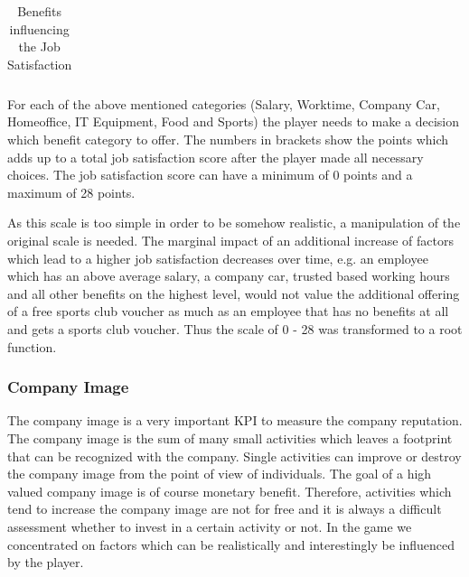 \begin{table}[]
\begin{tabular}{l|c|c}
\end{tabular}
\caption{Benefits influencing the Job Satisfaction}
    \label{tab:benefitsJSS}
\end{table}

For each of the above mentioned categories (Salary, Worktime, Company Car, Homeoffice, IT Equipment, Food and Sports) the player needs to make a decision which benefit category to offer. The numbers in brackets show the points which adds up to a total job satisfaction score after the player made all necessary choices. The job satisfaction score can have a minimum of 0 points and a maximum of 28 points.

As this scale is too simple in order to be somehow realistic, a manipulation of the original scale is needed. The marginal impact of an additional increase of factors which lead to a higher job satisfaction decreases over time, e.g. an employee which has an above average salary, a company car, trusted based working hours and all other benefits on the highest level, would not value the additional offering of a free sports club voucher as much as an employee that has no benefits at all and gets a sports club voucher. Thus the scale of 0 - 28 was transformed to a root function.


\subsubsection{Company Image}
The company image is a very important KPI to measure the company reputation. The company image is the sum of many small activities which leaves a footprint that can be recognized with the company. Single activities can improve or destroy the company image from the point of view of individuals. The goal of a high valued company image is of course monetary benefit. Therefore, activities which tend to increase the company image are not for free and it is always a difficult assessment whether to invest in a certain activity or not. In the game we concentrated on factors which can be realistically and interestingly be influenced by the player.

